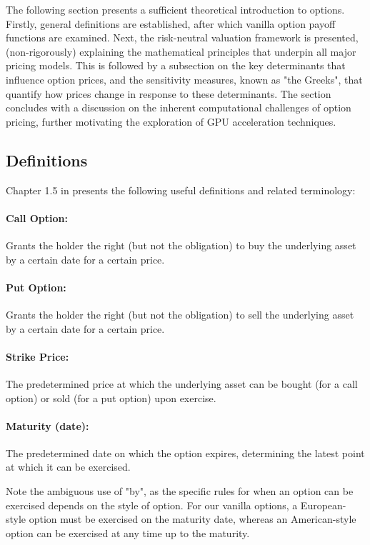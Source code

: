 \documentclass[english,12pt,a4paper,pdftex,sci,utf8]{aaltothesis}
\begin{document}
The following section presents a sufficient theoretical introduction to options. Firstly, general definitions are established, after which 
vanilla option payoff functions are examined. Next, the risk-neutral valuation framework is presented, (non-rigorously) explaining the mathematical principles that underpin all major pricing models. This is followed by a subsection on the key determinants that influence option prices, and the sensitivity measures, known as "the Greeks", that quantify how prices change in response to these determinants. The section concludes with a discussion on the inherent computational challenges of option pricing, further motivating the exploration of GPU acceleration techniques.


\subsection{Definitions}
Chapter 1.5 in \cite{hull2016options} presents the following useful definitions and related terminology:

\paragraph{Call Option:}Grants the holder the right (but not the obligation) to buy the underlying asset by a certain date for a certain price.

\paragraph{Put Option:}Grants the holder the right (but not the obligation) to sell the underlying asset by a certain date for a certain price.

\paragraph{Strike Price:}The predetermined price at which the underlying asset can be bought (for a call option) or sold (for a put option) upon exercise.

\paragraph{Maturity (date):}The predetermined date on which the option expires, determining the latest point at which it can be exercised.
\bigskip

Note the ambiguous use of "by", as the specific rules for when an option can be exercised depends on the style of option. For our vanilla options, a European-style option must be exercised on the maturity date, whereas an American-style option can be exercised at any time up to the maturity.
\end{document}
